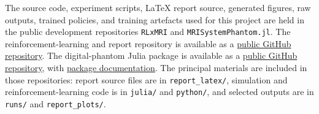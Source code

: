 The source code, experiment scripts, LaTeX report source, generated figures, raw outputs, trained policies, and training artefacts used for this project are held in the public development repositories \texttt{RLxMRI} and \texttt{MRISystemPhantom.jl}. The reinforcement-learning and report repository is available as a \href{https://github.com/ArthurAllilaire/RLxMRI}{public GitHub repository}. The digital-phantom Julia package is available as a \href{https://github.com/ArthurAllilaire/MRISystemPhantom.jl}{public GitHub repository}, with \href{https://arthurallilaire.github.io/MRISystemPhantom.jl/}{package documentation}. The principal materials are included in those repositories: report source files are in \texttt{report\_latex/}, simulation and reinforcement-learning code is in \texttt{julia/} and \texttt{python/}, and selected outputs are in \texttt{runs/} and \texttt{report\_plots/}.
